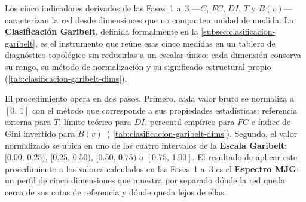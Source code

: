 

Los cinco indicadores derivados de las Fases~1 a~3 ---$C$, $FC$, $DI$, $T$ y
$B(v)$--- caracterizan la red desde dimensiones que no comparten unidad de
medida. La \textbf{Clasificación Garibelt}, definida formalmente en la
\autoref{subsec:clasificacion-garibelt}, es el instrumento que reúne esas cinco
medidas en un tablero de diagnóstico topológico sin reducirlas a un escalar
único: cada dimensión conserva su rango, su método de normalización y su
significado estructural propio (\autoref{tab:clasificacion-garibelt-dims}).

El procedimiento opera en dos pasos. Primero, cada valor bruto se normaliza a
$[0,\,1]$ con el método que corresponde a sus propiedades estadísticas:
referencia externa para $T$, límite teórico para $DI$, percentil empírico para
$FC$ e índice de Gini invertido para $B(v)$~(
\autoref{tab:clasificacion-garibelt-dims}). Segundo, el valor normalizado se
ubica en uno de los cuatro intervalos de la \textbf{Escala Garibelt}:
$[0.00,\,0.25)$, $[0.25,\,0.50)$, $[0.50,\,0.75)$ o $[0.75,\,1.00]$. El
resultado de aplicar este procedimiento a los valores calculados en las
Fases~1 a~3 es el \textbf{Espectro MJG}: un perfil de cinco dimensiones que
muestra por separado dónde la red queda cerca de sus cotas de referencia y
dónde queda lejos de ellas.
